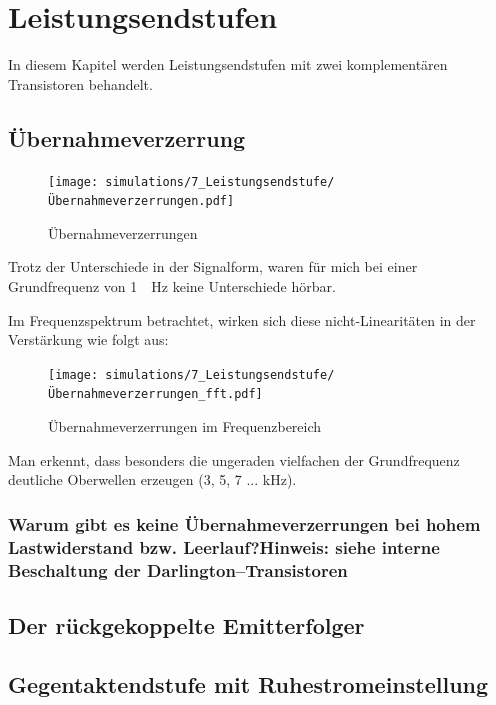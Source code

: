 \chapter{Leistungsendstufen}

In diesem Kapitel werden Leistungsendstufen mit zwei komplementären Transistoren behandelt.

\section{Übernahmeverzerrung}

\begin{figure}[H]
    \centering
    \texttt{[image: simulations/7\_Leistungsendstufe/Übernahmeverzerrungen.pdf]}
    \caption{Übernahmeverzerrungen}
    \label{fig:my_label}
\end{figure}

Trotz der Unterschiede in der Signalform, waren für mich bei einer Grundfrequenz von \SI{1}{\hilo \hertz} keine Unterschiede hörbar.

Im Frequenzspektrum betrachtet, wirken sich diese nicht-Linearitäten  in der Verstärkung wie folgt aus:

\begin{figure}[H]
    \centering
    \texttt{[image: simulations/7\_Leistungsendstufe/Übernahmeverzerrungen\_fft.pdf]}
    \caption{Übernahmeverzerrungen im Frequenzbereich}
\end{figure}

Man erkennt, dass besonders die ungeraden vielfachen der Grundfrequenz deutliche Oberwellen erzeugen (3, 5, 7 ... kHz).

\subsection{Warum gibt es keine Übernahmeverzerrungen bei hohem Lastwiderstand bzw. Leerlauf?Hinweis: siehe interne Beschaltung der Darlington–Transistoren}


\section{Der rückgekoppelte Emitterfolger}

\section{Gegentaktendstufe mit Ruhestromeinstellung}

